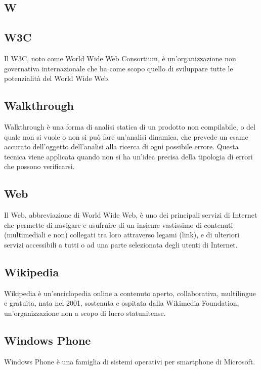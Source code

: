 \newpage

\begin{center}
\Huge\section*{\uppercase{W}}
\end{center}

\subsection*{W3C}
Il W3C, noto come World Wide Web Consortium, è un'organizzazione non governativa internazionale che ha come scopo quello di sviluppare tutte le potenzialità del World Wide Web.

\subsection*{Walkthrough }
Walkthrough è una forma di analisi statica di un prodotto non compilabile, o del
quale non si vuole o non si può fare un'analisi dinamica, che prevede un esame accurato
dell'oggetto dell'analisi alla ricerca di ogni possibile errore. Questa tecnica viene applicata
quando non si ha un'idea precisa della tipologia di errori che possono verificarsi.

\subsection*{Web}
Il Web, abbreviazione di World Wide Web, è uno dei principali servizi di Internet che permette di navigare e usufruire di un insieme vastissimo di contenuti (multimediali e non) collegati tra loro attraverso legami (link), e di ulteriori servizi accessibili a tutti o ad una parte selezionata degli utenti di Internet.

\subsection*{Wikipedia}
Wikipedia è un'enciclopedia online a contenuto aperto, collaborativa, multilingue e gratuita, nata nel 2001, sostenuta e ospitata dalla Wikimedia Foundation, un'organizzazione non a scopo di lucro statunitense.

\subsection*{Windows Phone}
Windows Phone è una famiglia di sistemi operativi per smartphone di Microsoft.

